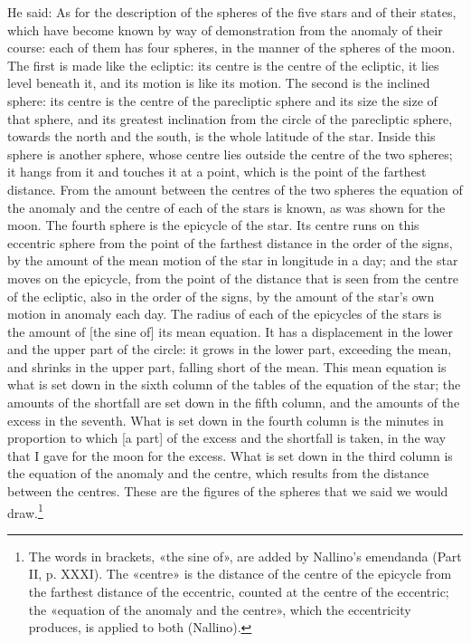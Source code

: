 \documentclass[11pt]{article}
\begin{document}
\par He said: As for the description of the spheres of the five stars and of their states, which have become known by way of demonstration from the anomaly of their course: each of them has four spheres, in the manner of the spheres of the moon. The first is made like the ecliptic: its centre is the centre of the ecliptic, it lies level beneath it, and its motion is like its motion. The second is the inclined sphere: its centre is the centre of the parecliptic sphere and its size the size of that sphere, and its greatest inclination from the circle of the parecliptic sphere, towards the north and the south, is the whole latitude of the star. Inside this sphere is another sphere, whose centre lies outside the centre of the two spheres; it hangs from it and touches it at a point, which is the point of the farthest distance. From the amount between the centres of the two spheres the equation of the anomaly and the centre of each of the stars is known, as was shown for the moon. The fourth sphere is the epicycle of the star. Its centre runs on this eccentric sphere from the point of the farthest distance in the order of the signs, by the amount of the mean motion of the star in longitude in a day; and the star moves on the epicycle, from the point of the distance that is seen from the centre of the ecliptic, also in the order of the signs, by the amount of the star's own motion in anomaly each day. The radius of each of the epicycles of the stars is the amount of [the sine of] its mean equation. It has a displacement in the lower and the upper part of the circle: it grows in the lower part, exceeding the mean, and shrinks in the upper part, falling short of the mean. This mean equation is what is set down in the sixth column of the tables of the equation of the star; the amounts of the shortfall are set down in the fifth column, and the amounts of the excess in the seventh. What is set down in the fourth column is the minutes in proportion to which [a part] of the excess and the shortfall is taken, in the way that I gave for the moon for the excess. What is set down in the third column is the equation of the anomaly and the centre, which results from the distance between the centres. These are the figures of the spheres that we said we would draw.\footnote{The words in brackets, «the sine of», are added by Nallino's emendanda (Part II, p. XXXI). The «centre» is the distance of the centre of the epicycle from the farthest distance of the eccentric, counted at the centre of the eccentric; the «equation of the anomaly and the centre», which the eccentricity produces, is applied to both (Nallino).}\par
\end{document}
